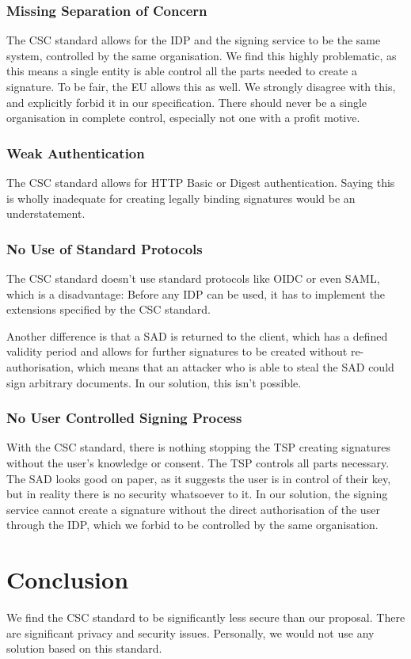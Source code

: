 \subsubsection{Missing Separation of Concern}
The \gls{CSC} standard allows for the \gls{IDP} and the signing service to be the same system,
controlled by the same organisation.
We find this highly problematic, as this means a single entity is able control all the parts needed to create a signature.
To be fair, the \gls{EU} allows this as well.
We strongly disagree with this, and explicitly forbid it in our specification.
There should never be a single organisation in complete control, especially not one with a profit motive.

\subsubsection{Weak Authentication}
The \gls{CSC} standard allows for \gls{HTTP} Basic or Digest authentication.
Saying this is wholly inadequate for creating legally binding signatures would be an understatement.

\subsubsection{No Use of Standard Protocols}
The \gls{CSC} standard doesn't use standard protocols like \gls{OIDC} or even \gls{SAML},
which is a disadvantage:
Before any \gls{IDP} can be used, it has to implement the extensions specified by the \gls{CSC} standard.

Another difference is that a \gls{SAD} is returned to the client,
which has a defined validity period and allows for further signatures to be created without re-authorisation,
which means that an attacker who is able to steal the \gls{SAD} could sign arbitrary documents.
In our solution, this isn't possible.

\subsubsection{No User Controlled Signing Process}
With the \gls{CSC} standard, there is nothing stopping the \gls{TSP} creating signatures without the user's knowledge or consent.
The \gls{TSP} controls all parts necessary.
The \gls{SAD} looks good on paper,
as it suggests the user is in control of their key,
but in reality there is no security whatsoever to it.
In our solution, the signing service cannot create a signature without the direct authorisation of the user through the \gls{IDP},
which we forbid to be controlled by the same organisation.

\section{Conclusion}\label{sec:conclusion}
We find the \gls{CSC} standard to be significantly less secure than our proposal.
There are significant privacy and security issues.
Personally, we would not use any solution based on this standard.
